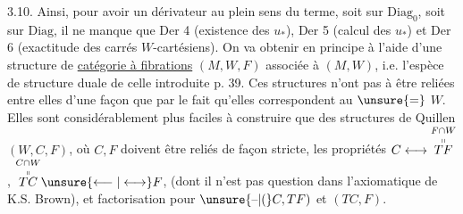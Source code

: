 
3.10. Ainsi, pour avoir un dérivateur au plein
sens du terme, soit sur $\mathrm{Diag}_0$, soit sur
$\mathrm{Diag}$, il ne manque que Der 4 (existence
des $u_*$), Der 5 (calcul des $u_*$) et
Der 6 (exactitude des carrés $W$-cartésiens).
On va  obtenir en principe à l'aide
d'une structure de \uline{catégorie à fibrations}
$(M,W,F)$ associée à $(M,W)$,  i.e.
l'espèce de structure duale de celle
introduite  p. 39. Ces  structures
n'ont pas à être reliées entre elles d'une
façon  que par le fait qu'elles
correspondent au $\unsure{=}$ $W$. Elles sont
considérablement plus faciles à 
construire que des structures de Quillen
$(W,C,F)$, où $C,F$ doivent être reliés
de façon  stricte,  
 les propriétés $C\longleftrightarrow\overset{F\cap W}{\overset{\shortparallel}{TF}}$, $\overset{C\cap W}{\overset{\shortparallel}{TC}}\unsure{\longleftarrow|\longleftrightarrow} F$,
(dont il n'est pas question dans l'axiomatique
de K.S. Brown), et factorisation pour
$\unsure{\text{--}|(}C,TF)$ et $(TC,F)$.
